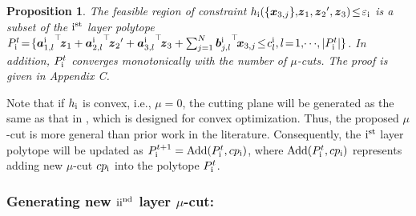 \documentclass[letterpaper]{article}
\newtheorem{prop}{Proposition}
\begin{document}
\begin{prop}
\label{prop:1}
The feasible region of constraint $h_{\rm{\uppercase\expandafter{\romannumeral1}}}(\{{\boldsymbol{x}_{3,j}}\},\!\boldsymbol{z}_1, {\boldsymbol{z}_2}',\boldsymbol{z}_3 )\! \le \! \varepsilon_{\rm{\uppercase\expandafter{\romannumeral1}}}$  is a subset of the ${\rm{\uppercase\expandafter{\romannumeral1}}}^{\rm{st}}$ layer polytope  $P_{\rm{\uppercase\expandafter{\romannumeral1}}}^{t}\!=\! \{{\boldsymbol{a}_{1,l}^{\rm{\uppercase\expandafter{\romannumeral1}}}}^{\top}\!{\boldsymbol{z}_1} + {\boldsymbol{a}_{2,l}^{\rm{\uppercase\expandafter{\romannumeral1}}}}^{\top}\!{\boldsymbol{z}_2}' + {\boldsymbol{a}_{3,l}^{\rm{\uppercase\expandafter{\romannumeral1}}}}^{\top}\!{\boldsymbol{z}_3} + \sum\nolimits_{j = 1}^N {\boldsymbol{b}{{_{j,l}^{\rm{\uppercase\expandafter{\romannumeral1}}}}}}^{\top}\!{\boldsymbol{x}_{3,j}}  \!\le\! c_l^{\rm{\uppercase\expandafter{\romannumeral1}}},l \!=\! 1,\! \cdots\! ,|P_{\rm{\uppercase\expandafter{\romannumeral1}}}^{t}| \}$. In addition, $P_{\rm{\uppercase\expandafter{\romannumeral1}}}^{t}$ converges monotonically with the number of $\mu$-cuts. The proof is given in Appendix C.
\end{prop}


Note that if $h_{\rm{\uppercase\expandafter{\romannumeral1}}}$ is convex, i.e., $\mu=0$, the cutting plane will be generated as the same as that in \cite{franc2011cutting,jiao2022asynchronous}, which is designed for convex optimization. Thus, the proposed $\mu$-cut is more general than prior work in the literature. Consequently, the ${\rm{\uppercase\expandafter{\romannumeral1}}}^{\rm{st}}$ layer polytope will be updated as
${P_{\rm{\uppercase\expandafter{\romannumeral1}}}^{t + 1}} = {\rm{Add}}({P_{\rm{\uppercase\expandafter{\romannumeral1}}}^{t}},{cp_{\rm{\uppercase\expandafter{\romannumeral1}}}})$,
where ${\rm{Add}}({P_{\rm{\uppercase\expandafter{\romannumeral1}}}^{t}},{cp_{\rm{\uppercase\expandafter{\romannumeral1}}}})$ represents adding new $\mu$-cut ${cp_{\rm{\uppercase\expandafter{\romannumeral1}}}}$ into the polytope ${P_{\rm{\uppercase\expandafter{\romannumeral1}}}^{t}}$.


\subsubsection{Generating new ${\rm{\uppercase\expandafter{\romannumeral2}}}^{\rm{nd}}$ layer $\mu$-cut:}
\end{document}
